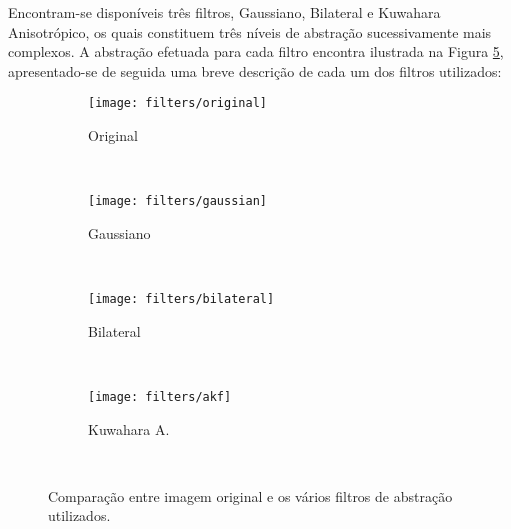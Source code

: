 Encontram-se disponíveis três filtros, Gaussiano, Bilateral e Kuwahara Anisotrópico, os quais constituem três níveis de abstração sucessivamente mais complexos. A abstração efetuada para cada filtro encontra  ilustrada na Figura \ref{fig:filters}, apresentado-se de seguida uma breve descrição de cada um dos filtros utilizados:

\begin{figure}[t]
        \centering
        \begin{subfigure}[b]{0.2\textwidth}
                \centering
                \texttt{[image: filters/original]}
                \caption{Original}
                \label{fig:filters-original}
        \end{subfigure}%
        ~
        \begin{subfigure}[b]{0.2\textwidth}
                \centering
                \texttt{[image: filters/gaussian]}
                \caption{Gaussiano}
                \label{fig:filters-gaussian}
        \end{subfigure}
        ~ 
        \begin{subfigure}[b]{0.2\textwidth}
                \centering
                \texttt{[image: filters/bilateral]}
                \caption{Bilateral}
                \label{fig:filters-bilateral}
        \end{subfigure}
        ~
        \begin{subfigure}[b]{0.2\textwidth}
                \centering
                \texttt{[image: filters/akf]}
                \caption{Kuwahara A.}
                \label{fig:filters-kuwahara}
        \end{subfigure}
        ~ 
        \caption{Comparação entre imagem original e os vários filtros de abstração utilizados.}\label{fig:filters}
\end{figure}

